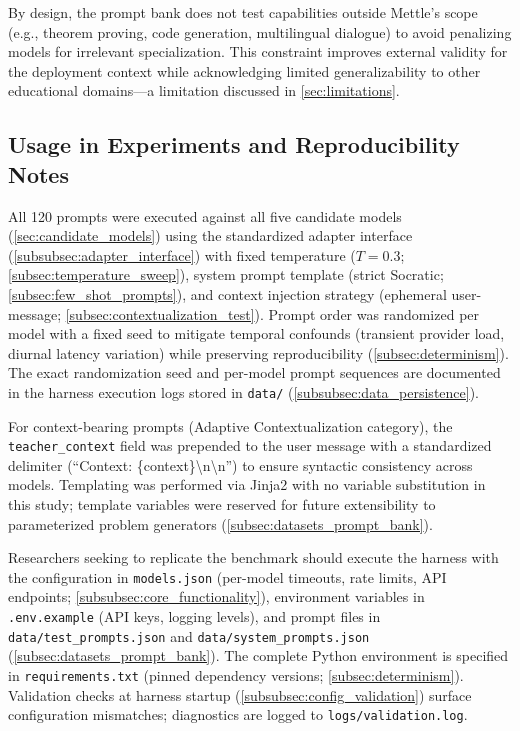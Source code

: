 By design, the prompt bank does not test capabilities outside Mettle's scope (e.g., theorem proving, code generation, multilingual dialogue) to avoid penalizing models for irrelevant specialization. This constraint improves external validity for the deployment context while acknowledging limited generalizability to other educational domains—a limitation discussed in \cref{sec:limitations}.

\subsection{Usage in Experiments and Reproducibility Notes}
\label{app:prompts_usage}

All 120 prompts were executed against all five candidate models (\cref{sec:candidate_models}) using the standardized adapter interface (\cref{subsubsec:adapter_interface}) with fixed temperature ($T=0.3$; \cref{subsec:temperature_sweep}), system prompt template (strict Socratic; \cref{subsec:few_shot_prompts}), and context injection strategy (ephemeral user-message; \cref{subsec:contextualization_test}). Prompt order was randomized per model with a fixed seed to mitigate temporal confounds (transient provider load, diurnal latency variation) while preserving reproducibility (\cref{subsec:determinism}). The exact randomization seed and per-model prompt sequences are documented in the harness execution logs stored in \texttt{data/} (\cref{subsubsec:data_persistence}).

For context-bearing prompts (Adaptive Contextualization category), the \texttt{teacher\_context} field was prepended to the user message with a standardized delimiter (``Context: \{context\}\textbackslash{}n\textbackslash{}n'') to ensure syntactic consistency across models. Templating was performed via Jinja2 with no variable substitution in this study; template variables were reserved for future extensibility to parameterized problem generators (\cref{subsec:datasets_prompt_bank}).

Researchers seeking to replicate the benchmark should execute the harness with the configuration in \texttt{models.json} (per-model timeouts, rate limits, API endpoints; \cref{subsubsec:core_functionality}), environment variables in \texttt{.env.example} (API keys, logging levels), and prompt files in \texttt{data/test\_prompts.json} and \texttt{data/system\_prompts.json} (\cref{subsec:datasets_prompt_bank}). The complete Python environment is specified in \texttt{requirements.txt} (pinned dependency versions; \cref{subsec:determinism}). Validation checks at harness startup (\cref{subsubsec:config_validation}) surface configuration mismatches; diagnostics are logged to \texttt{logs/validation.log}.

